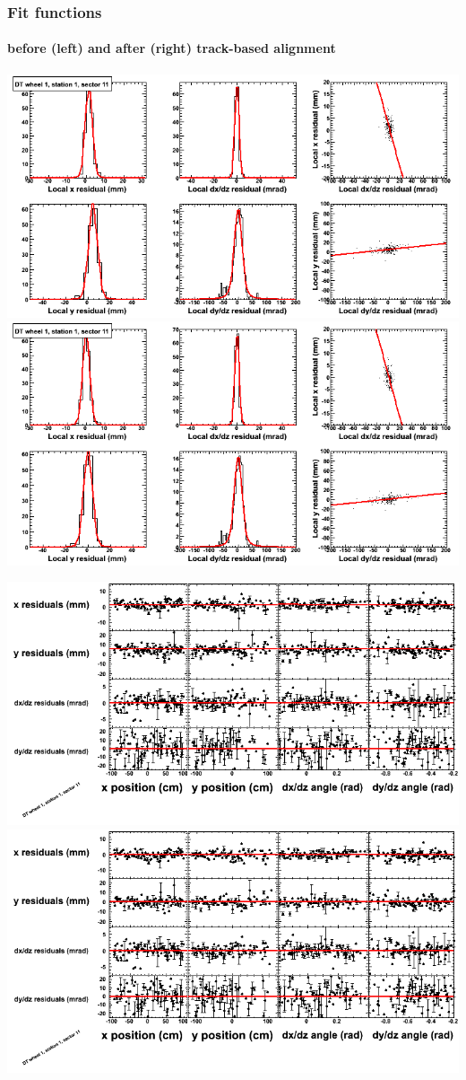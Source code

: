 \documentclass[compress]{beamer}
\begin{document}
\begin{frame}
\frametitle{Fit functions}
\framesubtitle{before (left) and after (right) track-based alignment}
\includegraphics[width=0.5\linewidth]{fitfunctions_re01/MBwhDst1sec11_bellcurves.png} \includegraphics[width=0.5\linewidth]{fitfunctions_re05/MBwhDst1sec11_bellcurves.png}

\includegraphics[width=0.5\linewidth]{fitfunctions_re01/MBwhDst1sec11_polynomials.png} \includegraphics[width=0.5\linewidth]{fitfunctions_re05/MBwhDst1sec11_polynomials.png}
\end{frame}
\end{document}

